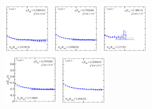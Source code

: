 \begin{figure}
  \includegraphics[width=0.22\textwidth]{figures/spectrum_a1gm/with_tq/fits/fit_1.pdf}
  \includegraphics[width=0.22\textwidth]{figures/spectrum_a1gm/with_tq/fits/fit_3.pdf}
  \includegraphics[width=0.22\textwidth]{figures/spectrum_a1gm/with_tq/fits/fit_2.pdf}\\
  \includegraphics[width=0.255\textwidth]{figures/spectrum_a1gm/with_tq/fits/fit_4.pdf}
  \includegraphics[width=0.22\textwidth]{figures/spectrum_a1gm/with_tq/fits/fit_5.pdf}

\end{figure}
